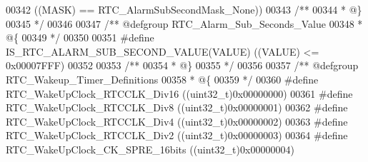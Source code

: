 \begin{DoxyCode}
00342                                               \textcolor{preprocessor}{(}\textcolor{preprocessor}{(}\textcolor{preprocessor}{MASK}\textcolor{preprocessor}{)} \textcolor{preprocessor}{==} 
      RTC_AlarmSubSecondMask_None\textcolor{preprocessor}{)}\textcolor{preprocessor}{)}
00343 \textcolor{comment}{/**}
00344 \textcolor{comment}{  * @\}}
00345 \textcolor{comment}{  */}
00346 
00347 \textcolor{comment}{/** @defgroup RTC\_Alarm\_Sub\_Seconds\_Value}
00348 \textcolor{comment}{  * @\{}
00349 \textcolor{comment}{  */}
00350 
00351 \textcolor{preprocessor}{#}\textcolor{preprocessor}{define} \textcolor{preprocessor}{IS\_RTC\_ALARM\_SUB\_SECOND\_VALUE}\textcolor{preprocessor}{(}\textcolor{preprocessor}{VALUE}\textcolor{preprocessor}{)} \textcolor{preprocessor}{(}\textcolor{preprocessor}{(}\textcolor{preprocessor}{VALUE}\textcolor{preprocessor}{)} \textcolor{preprocessor}{<=} 0x00007FFF\textcolor{preprocessor}{)}
00352 
00353 \textcolor{comment}{/**}
00354 \textcolor{comment}{  * @\}}
00355 \textcolor{comment}{  */}
00356 
00357 \textcolor{comment}{/** @defgroup RTC\_Wakeup\_Timer\_Definitions }
00358 \textcolor{comment}{  * @\{}
00359 \textcolor{comment}{  */}
00360 \textcolor{preprocessor}{#}\textcolor{preprocessor}{define} \textcolor{preprocessor}{RTC\_WakeUpClock\_RTCCLK\_Div16}        \textcolor{preprocessor}{(}\textcolor{preprocessor}{(}\textcolor{preprocessor}{uint32\_t}\textcolor{preprocessor}{)}0x00000000\textcolor{preprocessor}{)}
00361 \textcolor{preprocessor}{#}\textcolor{preprocessor}{define} \textcolor{preprocessor}{RTC\_WakeUpClock\_RTCCLK\_Div8}         \textcolor{preprocessor}{(}\textcolor{preprocessor}{(}\textcolor{preprocessor}{uint32\_t}\textcolor{preprocessor}{)}0x00000001\textcolor{preprocessor}{)}
00362 \textcolor{preprocessor}{#}\textcolor{preprocessor}{define} \textcolor{preprocessor}{RTC\_WakeUpClock\_RTCCLK\_Div4}         \textcolor{preprocessor}{(}\textcolor{preprocessor}{(}\textcolor{preprocessor}{uint32\_t}\textcolor{preprocessor}{)}0x00000002\textcolor{preprocessor}{)}
00363 \textcolor{preprocessor}{#}\textcolor{preprocessor}{define} \textcolor{preprocessor}{RTC\_WakeUpClock\_RTCCLK\_Div2}         \textcolor{preprocessor}{(}\textcolor{preprocessor}{(}\textcolor{preprocessor}{uint32\_t}\textcolor{preprocessor}{)}0x00000003\textcolor{preprocessor}{)}
00364 \textcolor{preprocessor}{#}\textcolor{preprocessor}{define} \textcolor{preprocessor}{RTC\_WakeUpClock\_CK\_SPRE\_16bits}      \textcolor{preprocessor}{(}\textcolor{preprocessor}{(}\textcolor{preprocessor}{uint32\_t}\textcolor{preprocessor}{)}0x00000004\textcolor{preprocessor}{)}

\end{DoxyCode}
